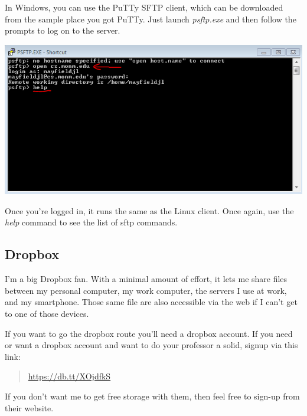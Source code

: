 \documentclass[]{tufte-handout}
\begin{document}
In Windows, you can use the PuTTy SFTP client, which can be downloaded from the sample place you got PuTTy. Just launch \textit{psftp.exe} and then follow the prompts to log on to the server. 

\vspace{.1in}
\begin{center}
\includegraphics[scale=.75]{PSFTP-loginAndHelp.PNG}
\end{center}
\vspace{.1in}

Once you're logged in, it runs the same as the Linux client. Once again, use the \textit{help} command to see the list of sftp commands.

\subsection{Dropbox}

I'm a big Dropbox fan. With a minimal amount of effort, it lets me share files between my personal computer, my work computer, the servers I use at work, and my smartphone.  Those same file are also accessible via the web if I can't get to one of those devices.

If you want to go the dropbox route you'll need a dropbox account. If you need or want a dropbox account and want to do your professor a solid, signup via this link:
\begin{quote}
\url{https://db.tt/XOjdfkS}
\end{quote}
If you don't want me to get free storage with them, then feel free to sign-up from their website. 
\end{document}

